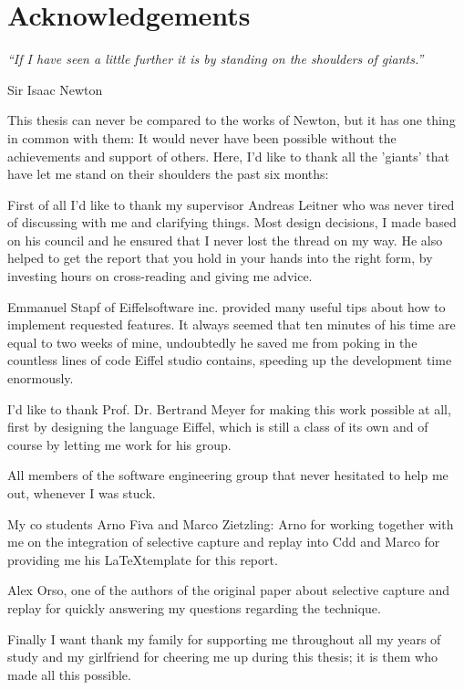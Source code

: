 \chapter*{Acknowledgements}
\begin{center}
 \textit{``If I have seen a little further it is by standing on the shoulders of giants.''}
\end{center}
\begin{flushright}
 Sir Isaac Newton
\end{flushright}

This thesis can never be compared to the works of Newton, but it has one thing in common with them: It would never have been possible without the achievements and support of others. Here, I'd like to thank all the 'giants' that have let me stand on their shoulders the past six months:

First of all I'd like to thank my supervisor Andreas Leitner who was never tired of discussing with me and clarifying things. Most design decisions, I made based on his council and he ensured that I never lost the thread on my way. He also helped to get the report that you hold in your hands into the right form, by investing hours on cross-reading and giving me advice.

Emmanuel Stapf of Eiffelsoftware inc. provided many useful tips about how to implement requested features. It always seemed that ten minutes of his time are equal to two weeks of mine, undoubtedly he saved me from poking in the countless lines of code Eiffel studio contains, speeding up the development time enormously.

I'd like to thank Prof. Dr. Bertrand Meyer for making this work possible at all, first by designing the language Eiffel, which is still a class of its own and of course by letting me work for his group.

All members of the software engineering group that never hesitated to help me out, whenever I was stuck.

My co students Arno Fiva and Marco Zietzling: Arno for working together with me on the integration of selective capture and replay into Cdd and Marco for providing me his \LaTeX template for this report.

Alex Orso, one of the authors of the original paper about selective capture and replay \cite{orso05may} for quickly answering my questions regarding the technique.

Finally I want thank my family for supporting me throughout all my years of study and my girlfriend for cheering me up during this thesis; it is them who made all this possible.